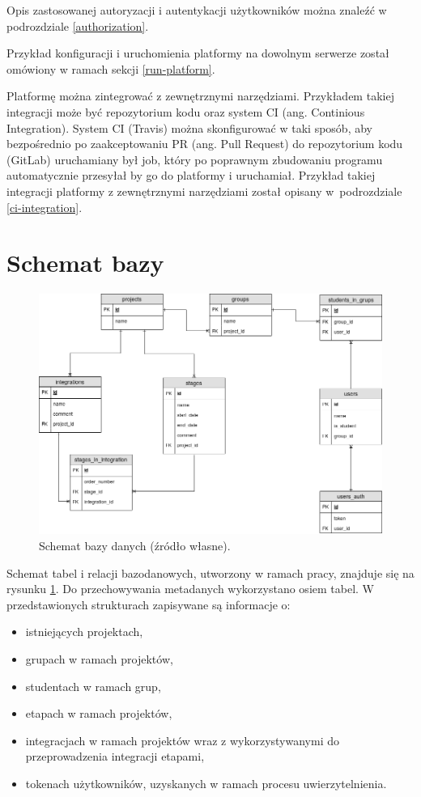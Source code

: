 Opis zastosowanej autoryzacji i autentykacji użytkowników można znaleźć w podrozdziale \ref{authorization}.

Przykład konfiguracji i uruchomienia platformy na dowolnym serwerze został omówiony w ramach sekcji \ref{run-platform}.

Platformę można zintegrować z zewnętrznymi narzędziami.
Przykładem takiej integracji może być repozytorium kodu oraz system CI (ang. Continious Integration).
System CI (Travis) można skonfigurować w taki sposób, aby bezpośrednio po zaakceptowaniu PR (ang. Pull Request) do repozytorium kodu (GitLab) uruchamiany był job, który po poprawnym zbudowaniu programu automatycznie przesyłał by go do platformy i uruchamiał.
Przykład takiej integracji platformy z zewnętrznymi narzędziami został opisany w~podrozdziale \ref{ci-integration}.

\section{Schemat bazy}
\label{database}

\begin{figure}[h]
    \centering
    \includegraphics[width = 13cm]{chapter05/db_schema.png}
    \caption{Schemat bazy danych (źródło własne).}
    \label{fig:platform-db-schema}
\end{figure}

Schemat tabel i relacji bazodanowych, utworzony w ramach pracy, znajduje się na rysunku \ref{fig:platform-db-schema}.
Do przechowywania metadanych wykorzystano osiem tabel.
W przedstawionych strukturach zapisywane są informacje o:
\begin{itemize}
    \item istniejących projektach,
    \item grupach w ramach projektów,
    \item studentach w ramach grup,
    \item etapach w ramach projektów,
    \item integracjach w ramach projektów wraz z wykorzystywanymi do przeprowadzenia integracji etapami,
    \item tokenach użytkowników, uzyskanych w ramach procesu uwierzytelnienia.
\end{itemize}

